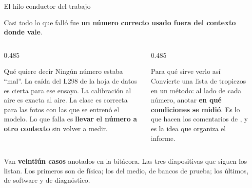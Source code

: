 \begin{frame}{El hilo conductor del trabajo}
  \begin{alertblock}{}
    \centering\large
    Casi todo lo que falló fue \textbf{un número correcto usado fuera del
    contexto donde vale}.
  \end{alertblock}

  \vspace{0.5em}
  \begin{columns}[T,onlytextwidth]
    \begin{column}{0.485\textwidth}
      \begin{block}{Qué quiere decir}
        {\small Ningún número estaba ``mal''. La caída del L298 de la hoja de datos
        es cierta para ese ensayo. La calibración al aire es exacta al aire.
        La clase  es correcta para las fotos con las que se
        entrenó el modelo. Lo que falla es \textbf{llevar el número a otro
        contexto} sin volver a medir.}
      \end{block}
    \end{column}
    \begin{column}{0.485\textwidth}
      \begin{block}{Para qué sirve verlo así}
        {\small Convierte una lista de tropiezos en un método: al lado de cada
        número, anotar \textbf{en qué condiciones se midió}. Es lo que hacen
        los comentarios de , y es la idea que organiza el
        informe.}
      \end{block}
    \end{column}
  \end{columns}

  \vspace{0.5em}
  {\footnotesize Van \textbf{veintiún casos} anotados en la bitácora. Las tres
  diapositivas que siguen los listan. Los primeros son de física; los del
  medio, de bancos de prueba; los últimos, de software y de diagnóstico.}
\end{frame}


